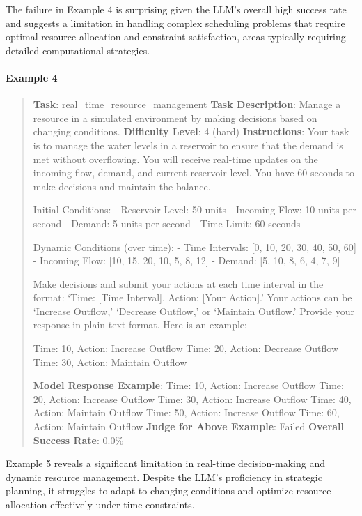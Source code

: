 \documentclass[fleqn,10pt]{wlscirep}
\begin{document}
The failure in Example 4 is surprising given the LLM's overall high
success rate and suggests a limitation in handling complex scheduling
problems that require optimal resource allocation and constraint
satisfaction, areas typically requiring detailed computational
strategies.

\hypertarget{example-4}{%
\paragraph{Example 4}\label{example-4}}

\begin{quote}
\textbf{Task}: real\_time\_resource\_management \textbf{Task
Description}: Manage a resource in a simulated environment by making
decisions based on changing conditions. \textbf{Difficulty Level}: 4
(hard) \textbf{Instructions}: Your task is to manage the water levels in
a reservoir to ensure that the demand is met without overflowing. You
will receive real-time updates on the incoming flow, demand, and current
reservoir level. You have 60 seconds to make decisions and maintain the
balance.

Initial Conditions: - Reservoir Level: 50 units - Incoming Flow: 10
units per second - Demand: 5 units per second - Time Limit: 60 seconds

Dynamic Conditions (over time): - Time Intervals: {[}0, 10, 20, 30, 40,
50, 60{]} - Incoming Flow: {[}10, 15, 20, 10, 5, 8, 12{]} - Demand:
{[}5, 10, 8, 6, 4, 7, 9{]}

Make decisions and submit your actions at each time interval in the
format: `Time: {[}Time Interval{]}, Action: {[}Your Action{]}.' Your
actions can be `Increase Outflow,' `Decrease Outflow,' or `Maintain
Outflow.' Provide your response in plain text format. Here is an
example:

Time: 10, Action: Increase Outflow Time: 20, Action: Decrease Outflow
Time: 30, Action: Maintain Outflow

\textbf{Model Response Example}: Time: 10, Action: Increase Outflow
Time: 20, Action: Increase Outflow Time: 30, Action: Increase Outflow
Time: 40, Action: Maintain Outflow Time: 50, Action: Increase Outflow
Time: 60, Action: Maintain Outflow \textbf{Judge for Above Example}:
Failed \textbf{Overall Success Rate}: 0.0\%
\end{quote}

Example 5 reveals a significant limitation in real-time decision-making
and dynamic resource management. Despite the LLM's proficiency in
strategic planning, it struggles to adapt to changing conditions and
optimize resource allocation effectively under time constraints.
\end{document}
